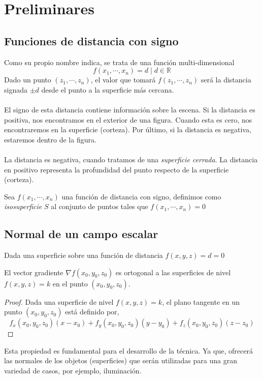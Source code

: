\chapter{Preliminares}


\section{Funciones de distancia con signo}

Como su propio nombre indica, se trata de una función multi-dimensional 
\[f(x_1,\cdots,x_n)=d \mid d \in \mathbb{R}\]
Dado un punto \((z_1,\cdots,z_n)\), el valor que tomará \(f(z_1,\cdots,z_n)\) será la distancia signada $\pm d$ desde el punto a la superficie más cercana.\\\\
El signo de esta distancia contiene información sobre la escena. Si la distancia es positiva, nos encontramos en el exterior de una figura. Cuando esta es cero, nos encontraremos en la superficie (corteza). Por último, si la distancia es negativa, estaremos dentro de la figura.\\\\
La distancia es negativa, cuando tratamos de una \textit{superficie cerrada}. La distancia en positivo representa la profundidad del punto respecto de la superficie (corteza). 

\begin{definition}
	Sea \(f(x_1, \cdots, x_n)\) una función de distancia con signo, definimos como \textit{isosuperficie} \(S\) al conjunto de puntos tales que \(f(x_1, \cdots, x_n) = 0\)
\end{definition}



\section{Normal de un campo escalar}

Dada una superficie sobre una función de distancia \(f(x, y, z)=d=0\)

\begin{theorem}
	El vector gradiente \(\nabla f(x_0, y_0, z_0)\)  es ortogonal a las superficies de nivel \(f(x, y, z)=k\) en el punto \((x_0, y_0, z_0)\).
\end{theorem}

\begin{proof}
	Dada una superficie de nivel \(f(x, y, z)=k\), el plano tangente en un punto \((x_0, y_0, z_0)\) está definido por,
	$$f_x(x_0, y_0, z_0)(x - x_0)+f_y(x_0, y_0, z_0)(y - y_0)+f_z(x_0, y_0, z_0)(z - z_0)$$
\end{proof}


Esta propiedad es fundamental para el desarrollo de la técnica. Ya que, ofrecerá las normales de los objetos (superficies) que serán utilizadas para una gran variedad de casos, por ejemplo, iluminación.

